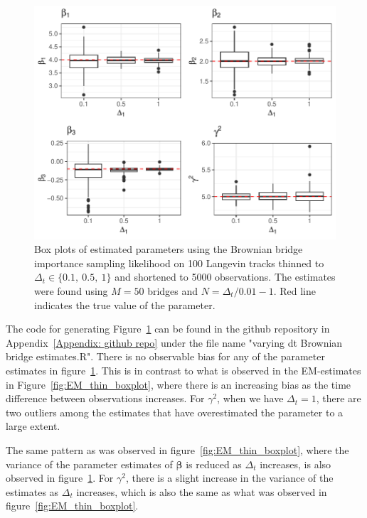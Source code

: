 \begin{figure}[H]
    \centering
    \includegraphics[width=\linewidth]{Images/Results/varying dt plot brownian bridge likelihood.pdf}
    \caption[Box plots of Parameter Estimates using Brownian bridge importance sampling at different sampling intervals]{Box plots of estimated parameters using the Brownian bridge importance sampling likelihood on 100 Langevin tracks thinned to $\Delta_t \in \{0.1, \ 0.5, \ 1\}$ and shortened to 5000 observations. The estimates were found using $M=50$ bridges and $N = \Delta_t/0.01 -1$. Red line indicates the true value of the parameter.}
    \label{fig:varying dt boxplot BB}
\end{figure}

The code for generating Figure~\ref{fig:varying dt boxplot BB} can be found in the github repository in Appendix~\ref{Appendix: github repo} under the file name "varying dt Brownian bridge estimates.R". There is no observable bias for any of the parameter estimates in figure~\ref{fig:varying dt boxplot BB}. This is in contrast to what is observed in the EM-estimates in Figure~\ref{fig:EM_thin_boxplot}, where there is an increasing bias as the time difference between observations increases. For $\gamma^2$, when we have $\Delta_t=1$, there are two outliers among the estimates that have overestimated the parameter to a large extent. 

The same pattern as was observed in figure~\ref{fig:EM_thin_boxplot}, where the variance of the parameter estimates of $\bm \beta$ is reduced as $\Delta_t$ increases, is also observed in figure~\ref{fig:varying dt boxplot BB}. For $\gamma^2$, there is a slight increase in the variance of the estimates as $\Delta_t$ increases, which is also the same as what was observed in figure~\ref{fig:EM_thin_boxplot}.



